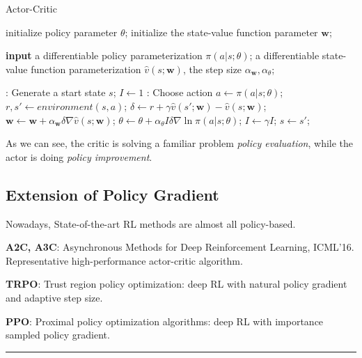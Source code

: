 \documentclass{progartcn}
\begin{document}
		\begin{algorithm}[H]
		\caption{Actor-Critic}
		\label{alg: Actor-Critic}
		\begin{algorithmic}[1]
			\State initialize policy parameter $\theta$; initialize the state-value function parameter $\bm{w}$;

            \State \textbf{input} a differentiable policy parameterization $\pi(a|s;\theta)$; a differentiable state-value function parameterization $\hat{v}(s;\bm{w})$, the step size $\alpha_{\bm{w}},\alpha_\theta$;
            
            :
        	\State Generate a start state $s$;
        	\State $I\gets 1$
        	:
        		\State Choose action $a\gets\pi(a|s;\theta)$;
        		\State $r,s'\gets environment(s,a)$;
        		\State $\delta\gets r+\gamma\hat{v}(s';\bm{w})-\hat{v}(s;\bm{w})$;
        		\State $\bm{w}\gets\bm{w}+\alpha_{\bm{w}}\delta\nabla \hat{v}(s;\bm{w})$;
        		\State $\theta\gets\theta+\alpha_\theta I\delta\nabla\ln \pi(a|s;\theta)$;
        		\State $I\gets \gamma I$;
        		\State $s\gets s'$;
        	\EndWhile
       		\EndFor
        \end{algorithmic}
        \end{algorithm}

		As we can see, the critic is solving a familiar problem \textit{policy evaluation}, while the actor is doing \textit{policy improvement}.\\


	\subsection{Extension of Policy Gradient}

		Nowadays, State-of-the-art RL methods are almost all policy-based.

		\textbf{A2C, A3C}: Asynchronous Methods for Deep Reinforcement Learning, ICML’16. Representative high-performance actor-critic algorithm.

		\textbf{TRPO}: Trust region policy optimization: deep RL with natural policy gradient and adaptive step size.

		\textbf{PPO}: Proximal policy optimization algorithms: deep RL with importance sampled policy gradient.

\noindent\rule[0.25\baselineskip]{\textwidth}{1pt}

\pagebreak

\end{document}
